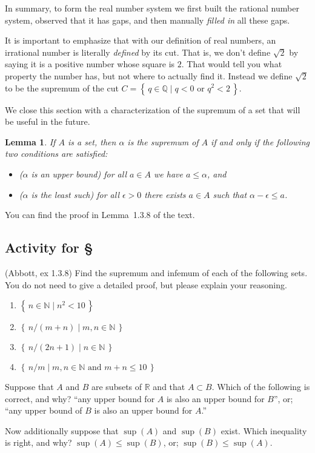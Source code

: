 \documentclass[11pt,oneside]{amsbook}
\newcommand{\set}[1]{\left\{\,#1\,\right\}}
\newcommand{\N}{\mathbb N}
\newcommand{\Q}{\mathbb Q}
\newcommand{\R}{\mathbb R}
\theoremstyle{definition}
\theoremstyle{plain}
\newtheorem{lemma}[theorem]{Lemma}
\theoremstyle{definition}
\theoremstyle{remark}
\numberwithin{equation}{section}
\numberwithin{figure}{section}
\newcounter{activityitem}
\newenvironment{activity}{\begin{list}{\arabic{activityitem}.}{\usecounter{activityitem}\setlength{\itemsep}{.2in}}}{\end{list}}
\begin{document}
In summary, to form the real number system we first built the rational number system, observed that it has gaps, and then manually \emph{filled in} all these gaps.

It is important to emphasize that with our definition of real numbers, an irrational number is literally \emph{defined} by its cut. That is, we don't define $\sqrt2$ by saying it is a positive number whose square is $2$. That would tell you what property the number has, but not where to actually find it. Instead we define $\sqrt2$ to be the supremum of the cut $C=\set{q\in\Q\mid q<0\text{ or }q^2<2}$.

We close this section with a characterization of the supremum of a set that will be useful in the future.

\begin{lemma}
  If $A$ is a set, then $\alpha$ is the supremum of $A$ if and only if the following two conditions are satisfied:
  \begin{itemize}
  \item ($\alpha$ is an upper bound) for all $a\in A$ we have $a\leq\alpha$, and
  \item ($\alpha$ is the least such) for all $\epsilon>0$ there exists $a\in A$ such that $\alpha-\epsilon\leq a$.
  \end{itemize}
\end{lemma}

You can find the proof in Lemma~1.3.8 of the text.

\newpage
\subsection*{Activity for \S \thesection}

\begin{activity}
  \item (Abbott, ex 1.3.8) Find the supremum and infemum of each of the following sets. You do not need to give a detailed proof, but please explain your reasoning.
  \begin{enumerate}\itemsep.5in
    \item $\set{n\in\N\mid n^2<10}$
    \item $\set{n/(m+n)\mid m,n\in\N}$
    \item $\set{n/(2n+1)\mid n\in\N}$
    \item $\set{n/m\mid m,n\in\N\text{ and }m+n\leq10}$
    \vspace{.5in}
  \end{enumerate}
  \item Suppose that $A$ and $B$ are subsets of $\R$ and that $A\subset B$.  Which of the following is correct, and why? ``any upper bound for $A$ is also an upper bound for $B$'', or; ``any upper bound of $B$ is also an upper bound for $A$.''

  Now additionally suppose that $\sup(A)$ and $\sup(B)$ exist.  Which inequality is right, and why? $\sup(A)\leq\sup(B)$, or; $\sup(B)\leq\sup(A)$.
  \vspace{\fill}
\end{activity}
\end{document}
